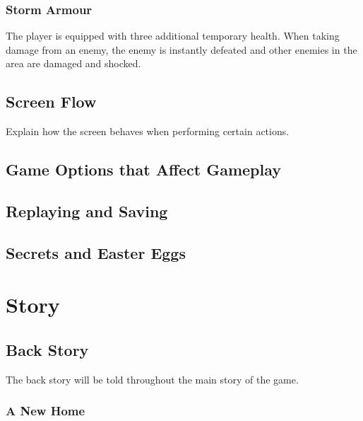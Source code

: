 \documentclass[12pt]{article}
\begin{document}
\subsubsection{Storm Armour}

The player is equipped with three additional temporary health. When taking damage from an enemy, the enemy is instantly defeated and other enemies in the area are damaged and shocked. 

\subsection{Screen Flow}

Explain how the screen behaves when performing certain actions.

\subsection{Game Options that Affect Gameplay}

\subsection{Replaying and Saving}

\subsection{Secrets and Easter Eggs}

\section{Story}

\subsection{Back Story}

The back story will be told throughout the main story of the game. 

\subsubsection{A New Home}
\end{document}
